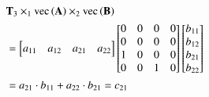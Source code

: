 \documentclass[preprint]{sigplanconf}
\newcommand{\M}[2][]{{\bm{#1\mathbf{\MakeUppercase{#2}}}}}
\newcommand{\ME}[3][]{#1{\MakeLowercase{#2}}_{#3}}
\begin{document}
\begin{align*}
& \M{T}_3 \times_{1} \vecmat{\M{A}} \times_{2} \vecmat{\M{B}} \\
&= \begin{bmatrix} \ME{A}{11} & \ME{A}{12} & \ME{A}{21} & \ME{A}{22} \end{bmatrix}
\begin{bmatrix}
0 & 0 & 0 & 0 \\
0 & 0 & 0 & 0 \\
1 & 0 & 0 & 0 \\
0 & 0 & 1 & 0 \\
\end{bmatrix}
\begin{bmatrix} \ME{B}{11} \\ \ME{B}{12} \\ \ME{B}{21} \\ \ME{B}{22} \end{bmatrix} \\
&= \ME{A}{21}\cdot \ME{B}{11} + \ME{A}{22} \cdot \ME{B}{21}
= \ME{C}{21}
\end{align*}
\end{document}

